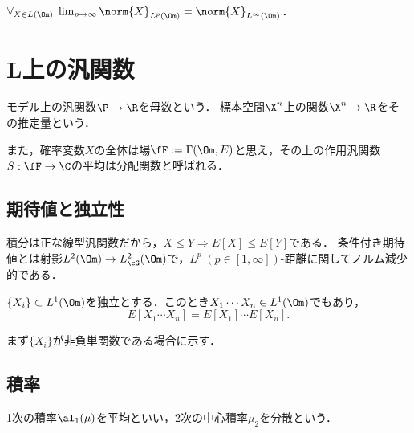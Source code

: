 \documentclass[uplatex,dvipdfmx]{jsreport}
\begin{document}
\begin{theorem}
    $\forall_{X\in L(\Om)}\;\lim_{p\to\infty}\norm{X}_{L^p(\Om)}=\norm{X}_{L^\infty(\Om)}$．
\end{theorem}

\section{L上の汎関数}

\begin{tcolorbox}[colframe=ForestGreen, colback=ForestGreen!10!white,breakable,colbacktitle=ForestGreen!40!white,coltitle=black,fonttitle=\bfseries\sffamily,
title=統計的問題では線型汎関数の推定が主眼となる所以である]
    モデル上の汎関数$\P\to\R$を母数という．
    標本空間$\X^n$上の関数$\X^n\to\R$をその推定量という．

    また，確率変数$X$の全体は場$\fF:=\Gamma(\Om,E)$と思え，その上の作用汎関数$S:\fF\to\C$の平均は分配関数と呼ばれる．
\end{tcolorbox}

\subsection{期待値と独立性}

\begin{tcolorbox}[colframe=ForestGreen, colback=ForestGreen!10!white,breakable,colbacktitle=ForestGreen!40!white,coltitle=black,fonttitle=\bfseries\sffamily,
title=]
    積分は正な線型汎関数だから，$X\le Y\Rightarrow E[X]\le E[Y]$である．
    条件付き期待値とは射影$L^2(\Om)\to L^2_{\cG}(\Om)$で，$L^p\;(p\in[1,\infty])$-距離に関してノルム減少的である．
\end{tcolorbox}

\begin{theorem}
    $\{X_i\}\subset L^1(\Om)$を独立とする．このとき$X_1\cdots X_n\in L^1(\Om)$でもあり，
    \[E[X_1\cdots X_n]=E[X_1]\cdots E[X_n].\]
\end{theorem}
\begin{Proof}
    まず$\{X_i\}$が非負単関数である場合に示す．
\end{Proof}

\subsection{積率}

\begin{tcolorbox}[colframe=ForestGreen, colback=ForestGreen!10!white,breakable,colbacktitle=ForestGreen!40!white,coltitle=black,fonttitle=\bfseries\sffamily,
title=]
    1次の積率$\al_1(\mu)$を平均といい，2次の中心積率$\mu_2$を分散という．
\end{tcolorbox}
\end{document}
